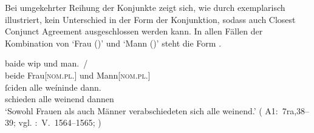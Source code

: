 Bei umgekehrter Reihung der Konjunkte zeigt sich, wie durch
 exemplarisch illustriert, kein Unterschied in der Form
der Konjunktion, sodass auch Closest Conjunct Agreement ausgeschlossen werden kann. In allen Fällen der Kombination von
 `Frau (\NeutF)' und  `Mann (\MascM)' steht die Form
.

\begin{exe}
\ex \label{ex:konjmixbeide2}
		\gll baide wip und man.~/ \\
			beide Frau[\textsc{nom.pl.\NeutF}] und Mann[\textsc{nom.pl.\MascM}] \\ %
	\sn \gll ſciden alle weíninde dann. \\
			schieden alle weinend dannen \\
		\trans `Sowohl Frauen als auch Männer verabschiedeten sich alle
			weinend.'
			(%
				A1:~7ra,38--39; vgl.
				\KC:~V.~1564--1565;
				\cite[110]{schroeder1895}%
			)



\end{exe}

